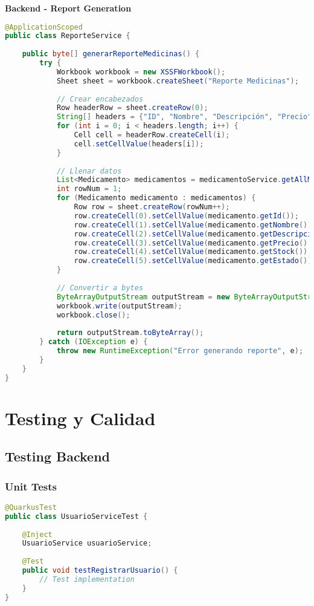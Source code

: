\documentclass[12pt,a4paper]{article}
\begin{document}
\textbf{Backend - Report Generation}
\begin{lstlisting}[language=java]
@ApplicationScoped
public class ReporteService {
    
    public byte[] generarReporteMedicinas() {
        try {
            Workbook workbook = new XSSFWorkbook();
            Sheet sheet = workbook.createSheet("Reporte Medicinas");
            
            // Crear encabezados
            Row headerRow = sheet.createRow(0);
            String[] headers = {"ID", "Nombre", "Descripción", "Precio", "Stock", "Estado"};
            for (int i = 0; i < headers.length; i++) {
                Cell cell = headerRow.createCell(i);
                cell.setCellValue(headers[i]);
            }
            
            // Llenar datos
            List<Medicamento> medicamentos = medicamentoService.getAllMedicamentos();
            int rowNum = 1;
            for (Medicamento medicamento : medicamentos) {
                Row row = sheet.createRow(rowNum++);
                row.createCell(0).setCellValue(medicamento.getId());
                row.createCell(1).setCellValue(medicamento.getNombre());
                row.createCell(2).setCellValue(medicamento.getDescripcion());
                row.createCell(3).setCellValue(medicamento.getPrecio().doubleValue());
                row.createCell(4).setCellValue(medicamento.getStock());
                row.createCell(5).setCellValue(medicamento.getEstado());
            }
            
            // Convertir a bytes
            ByteArrayOutputStream outputStream = new ByteArrayOutputStream();
            workbook.write(outputStream);
            workbook.close();
            
            return outputStream.toByteArray();
        } catch (IOException e) {
            throw new RuntimeException("Error generando reporte", e);
        }
    }
}
\end{lstlisting}

\section{Testing y Calidad}

\subsection{Testing Backend}

\subsubsection{Unit Tests}
\begin{lstlisting}[language=java]
@QuarkusTest
public class UsuarioServiceTest {
    
    @Inject
    UsuarioService usuarioService;
    
    @Test
    public void testRegistrarUsuario() {
        // Test implementation
    }
}
\end{lstlisting}
\end{document}
